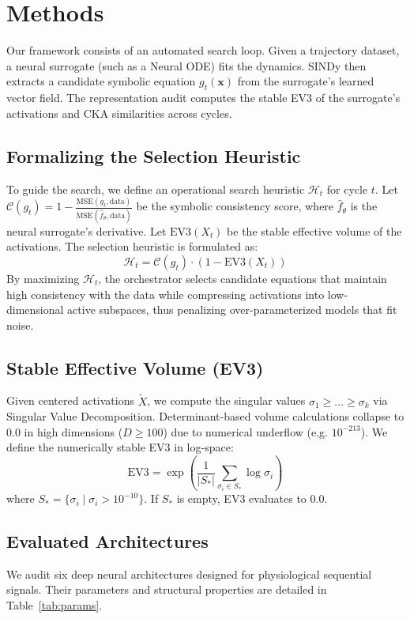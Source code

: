 \documentclass[twocolumn]{article}
\begin{document}
\section{Methods}
\label{sec:methods}
Our framework consists of an automated search loop. Given a trajectory dataset, a neural surrogate (such as a Neural ODE) fits the dynamics. SINDy then extracts a candidate symbolic equation $g_t(\mathbf{x})$ from the surrogate's learned vector field. The representation audit computes the stable EV3 of the surrogate's activations and CKA similarities across cycles.

\subsection{Formalizing the Selection Heuristic}
To guide the search, we define an operational search heuristic $\mathcal{H}_t$ for cycle $t$. Let $\mathcal{C}(g_t) = 1 - \frac{\text{MSE}(g_t, \text{data})}{\text{MSE}(\hat{f}_{\theta}, \text{data})}$ be the symbolic consistency score, where $\hat{f}_{\theta}$ is the neural surrogate's derivative. Let $\text{EV3}(X_t)$ be the stable effective volume of the activations. The selection heuristic is formulated as:
\begin{equation}
    \mathcal{H}_t = \mathcal{C}(g_t) \cdot \left(1 - \text{EV3}(X_t)\right)
\end{equation}
By maximizing $\mathcal{H}_t$, the orchestrator selects candidate equations that maintain high consistency with the data while compressing activations into low-dimensional active subspaces, thus penalizing over-parameterized models that fit noise.

\subsection{Stable Effective Volume (EV3)}
Given centered activations $\tilde{X}$, we compute the singular values $\sigma_1 \ge \dots \ge \sigma_k$ via Singular Value Decomposition. Determinant-based volume calculations collapse to $0.0$ in high dimensions ($D \ge 100$) due to numerical underflow (e.g. $10^{-213}$). We define the numerically stable EV3 in log-space:
\begin{equation}
    \text{EV3} = \exp\left( \frac{1}{|S_*|} \sum_{\sigma_i \in S_*} \log \sigma_i \right)
\end{equation}
where $S_* = \{\sigma_i \mid \sigma_i > 10^{-10}\}$. If $S_*$ is empty, EV3 evaluates to $0.0$.

\subsection{Evaluated Architectures}
We audit six deep neural architectures designed for physiological sequential signals. Their parameters and structural properties are detailed in Table~\ref{tab:params}.
\end{document}
